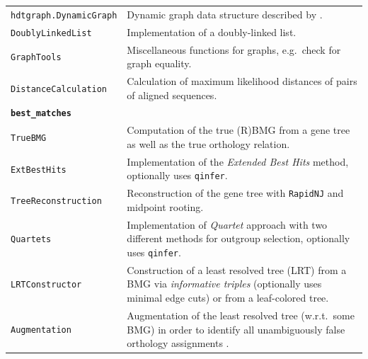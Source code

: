 \documentclass[hidelinks,11pt]{article}
\begin{document}
{\begin{longtable}{| p{4.0cm} | p{10cm} |}
	\texttt{hdtgraph.DynamicGraph} &
	Dynamic graph data structure described by \citet{holm2001}. \\
	\texttt{DoublyLinkedList} &
	Implementation of a doubly-linked list. \\
	\texttt{GraphTools} &
	Miscellaneous functions for graphs, e.g.\ check for graph equality. \\
	\texttt{DistanceCalculation} &
	Calculation of maximum likelihood distances of pairs of aligned sequences. \\
	\hline
	\multicolumn{2}{|l|}{\textbf{\texttt{best\_matches}}}\\
	\hline
	\texttt{TrueBMG} &
	Computation of the true (R)BMG from a gene tree as well as the true orthology relation. \\
	\texttt{ExtBestHits} &
	Implementation of the \emph{Extended Best Hits} method, optionally uses \texttt{qinfer}. \\
	\texttt{TreeReconstruction} &
	Reconstruction of the gene tree with \texttt{RapidNJ} \citep{simonsen2008} and midpoint rooting. \\
	\texttt{Quartets} &
	Implementation of \emph{Quartet} approach with two different methods for outgroup selection, optionally uses \texttt{qinfer}. \\
	\texttt{LRTConstructor} &
	Construction of a least resolved tree (LRT) from a BMG via \emph{informative triples} (optionally uses minimal edge cuts) or from a leaf-colored tree. \\
	\texttt{Augmentation} &
	Augmentation of the least resolved tree (w.r.t.\ some BMG) in order to identify all unambiguously false orthology assignments \citep{schaller2020}. \\

\end{longtable}}
\end{document}
